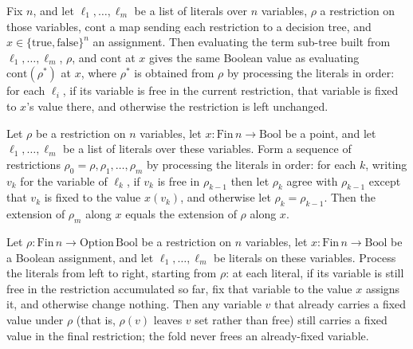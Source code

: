 \begin{lemma}
\label{SwitchingLemma.termSubTree_eval}
\leanok
{}
Fix $n$, and let $\ell_1,\dots,\ell_m$ be a list of literals over $n$ variables, $\rho$
a restriction on those variables, $\mathrm{cont}$ a map sending each restriction to a
decision tree, and $x \in \{\mathrm{true},\mathrm{false}\}^n$ an assignment. Then
evaluating the term sub-tree built from $\ell_1,\dots,\ell_m$, $\rho$, and
$\mathrm{cont}$ at $x$ gives the same Boolean value as evaluating
$\mathrm{cont}(\rho^\ast)$ at $x$, where $\rho^\ast$ is obtained from $\rho$ by
processing the literals in order: for each $\ell_i$, if its variable is free in the
current restriction, that variable is fixed to $x$'s value there, and otherwise the
restriction is left unchanged.
\end{lemma}

\begin{lemma}
\label{SwitchingLemma.termSubTree_extend_eq}
\leanok
{}
Let $\rho$ be a restriction on $n$ variables, let $x : \mathrm{Fin}\,n \to
\mathrm{Bool}$ be a point, and let $\ell_1, \dots, \ell_m$ be a list of literals over
these variables. Form a sequence of restrictions $\rho_0 = \rho, \rho_1, \dots, \rho_m$
by processing the literals in order: for each $k$, writing $v_k$ for the variable of
$\ell_k$, if $v_k$ is free in $\rho_{k-1}$ then let $\rho_k$ agree with $\rho_{k-1}$
except that $v_k$ is fixed to the value $x(v_k)$, and otherwise let $\rho_k =
\rho_{k-1}$. Then the extension of $\rho_m$ along $x$ equals the extension of $\rho$
along $x$.
\end{lemma}

\begin{lemma}
\label{SwitchingLemma.termSubTree_foldl_preserves_nonnone}
\leanok
{}
Let $\rho : \mathrm{Fin}\,n \to \mathrm{Option}\,\mathrm{Bool}$ be a restriction on $n$
variables, let $x : \mathrm{Fin}\,n \to \mathrm{Bool}$ be a Boolean assignment, and let
$\ell_1, \dots, \ell_m$ be literals on these variables. Process the literals from left
to right, starting from $\rho$: at each literal, if its variable is still free in the
restriction accumulated so far, fix that variable to the value $x$ assigns it, and
otherwise change nothing. Then any variable $v$ that already carries a fixed value under
$\rho$ (that is, $\rho(v)$ leaves $v$ set rather than free) still carries a fixed value
in the final restriction; the fold never frees an already-fixed variable.
\end{lemma}


